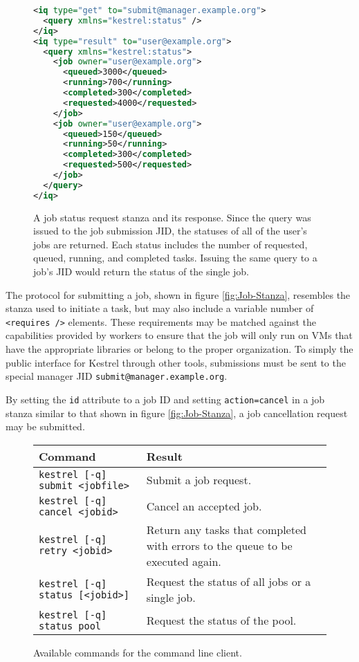 %
\begin{figure}
\begin{lstlisting}[language=XML,tabsize=4]
<iq type="get" to="submit@manager.example.org"> 
  <query xmlns="kestrel:status" /> 
</iq>
<iq type="result" to="user@example.org"> 
  <query xmlns="kestrel:status"> 
    <job owner="user@example.org"> 
      <queued>3000</queued> 
      <running>700</running> 
      <completed>300</completed> 
      <requested>4000</requested> 
    </job>
    <job owner="user@example.org"> 
      <queued>150</queued> 
      <running>50</running> 
      <completed>300</completed> 
      <requested>500</requested> 
    </job>
  </query> 
</iq>
\end{lstlisting}
\caption{\label{fig:Status-Stanza}A job status request stanza and its response.
Since the query was issued to the job submission JID, the statuses
of all of the user's jobs are returned. Each status includes the number
of requested, queued, running, and completed tasks. Issuing the same
query to a job's JID would return the status of the single job. }

\end{figure}


The protocol for submitting a job, shown in figure \ref{fig:Job-Stanza},
resembles the stanza used to initiate a task, but may also include
a variable number of \texttt{<requires />} elements. These requirements
may be matched against the capabilities provided by workers to ensure
that the job will only run on VMs that have the appropriate libraries
or belong to the proper organization. To simply the public interface
for Kestrel through other tools, submissions must be sent to the special
manager JID \texttt{submit@manager.example.org}.

By setting the \texttt{id} attribute to a job ID and setting \texttt{action=cancel}
in a job stanza similar to that shown in figure \ref{fig:Job-Stanza},
a job cancellation request may be submitted.

%
\begin{figure}
\begin{tabular}{ll}
Command  & Result \\
\hline 
\texttt{kestrel {[}-q{]} submit <jobfile>}  & Submit a job request. \\
\texttt{kestrel {[}-q{]} cancel <jobid>}  & Cancel an accepted job. \\
\texttt{kestrel {[}-q{]} retry <jobid>}  & Return any tasks that completed with errors to the queue to be executed
again.\\
\texttt{kestrel {[}-q{]} status {[}<jobid>{]}}  & Request the status of all jobs or a single job. \\
\texttt{kestrel {[}-q{]} status pool}  & Request the status of the pool. \\
\end{tabular}\caption{\label{fig:Commands} Available commands for the command line client.}

\end{figure}


